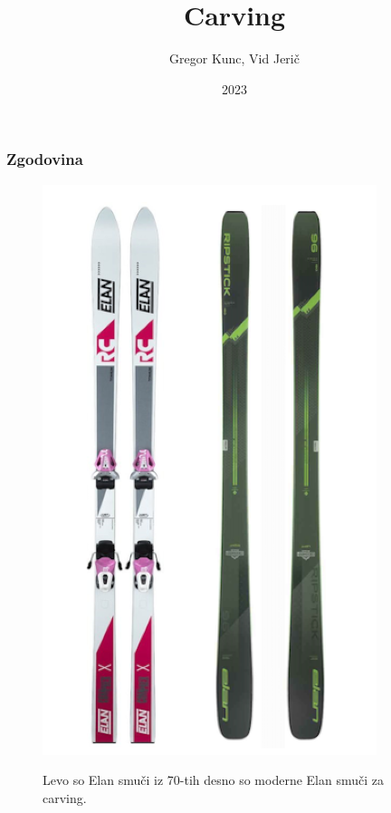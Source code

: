 \documentclass{beamer}
\title{Carving}
\author{Gregor Kunc, Vid Jerič}
\date{2023}
\begin{document}
\frame{\titlepage}

\begin{frame}
\frametitle{Zgodovina}

\begin{figure}
    \centering
    \includegraphics[scale=0.3]{../images/elan smuci.png} \\
    \caption[short]{Levo so Elan smuči iz 70-tih desno so moderne Elan smuči za carving.}
\end{figure}

\end{frame}
\end{document}
